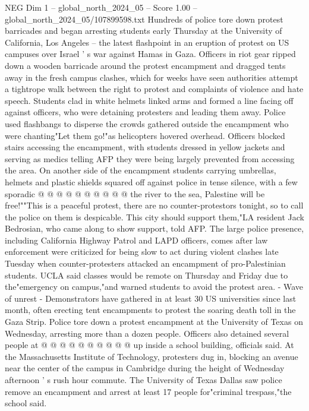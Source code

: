 \begin{textsample}{NEG Dim 1 – global\_north\_2024\_05 – Score 1.00 – global\_north\_2024\_05/107899598.txt}  \label{ex:f1_neg_056}
Hundreds of police tore down protest barricades and began arresting students early Thursday at the University of California, Los Angeles -- the latest flashpoint in an eruption of protest on US campuses over Israel ' s war against Hamas in Gaza.
Officers in riot gear ripped down a wooden barricade around the protest encampment and dragged tents away in the fresh campus clashes, which for weeks have seen authorities attempt a tightrope walk between the right to protest and complaints of violence and hate speech.
Students clad in white helmets linked arms and formed a line facing off against officers, who were detaining protesters and leading them away.
Police used flashbangs to disperse the crowds gathered outside the encampment who were chanting"Let them go!"as helicopters hovered overhead.
Officers blocked stairs accessing the encampment, with students dressed in yellow jackets and serving as medics telling AFP they were being largely prevented from accessing the area.
On another side of the encampment students carrying umbrellas, helmets and plastic shields squared off against police in tense silence, with a few sporadic @ @ @ @ @ @ @ @ @ @ the river to the sea, Palestine will be free!""This is a peaceful protest, there are no counter-protestors tonight, so to call the police on them is despicable.
This city should support them,"LA resident Jack Bedrosian, who came along to show support, told AFP.
The large police presence, including California Highway Patrol and LAPD officers, comes after law enforcement were criticized for being slow to act during violent clashes late Tuesday when counter-protesters attacked an encampment of pro-Palestinian students.
UCLA said classes would be remote on Thursday and Friday due to the"emergency on campus,"and warned students to avoid the protest area. - Wave of unrest - Demonstrators have gathered in at least 30 US universities since last month, often erecting tent encampments to protest the soaring death toll in the Gaza Strip.
Police tore down a protest encampment at the University of Texas on Wednesday, arresting more than a dozen people.
Officers also detained several people at @ @ @ @ @ @ @ @ @ @ up inside a school building, officials said.
At the Massachusetts Institute of Technology, protesters dug in, blocking an avenue near the center of the campus in Cambridge during the height of Wednesday afternoon ' s rush hour commute.
The University of Texas Dallas saw police remove an encampment and arrest at least 17 people for"criminal trespass,"the school said.

\end{textsample}
